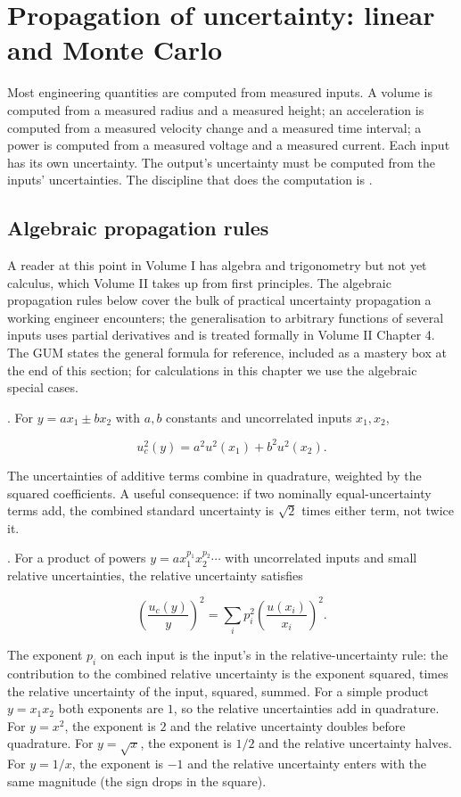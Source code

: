 \section{Propagation of uncertainty: linear and Monte Carlo}

Most engineering quantities are computed from measured inputs. A
volume is computed from a measured radius and a measured height; an
acceleration is computed from a measured velocity change and a
measured time interval; a power is computed from a measured voltage
and a measured current. Each input has its own uncertainty. The
output's uncertainty must be computed from the inputs'
uncertainties. The discipline that does the computation is
.

\subsection{Algebraic propagation rules}

A reader at this point in Volume I has algebra and trigonometry but
not yet calculus, which Volume II takes up from first principles.
The algebraic propagation rules below cover the bulk of practical
uncertainty propagation a working engineer encounters; the
generalisation to arbitrary functions of several inputs uses partial
derivatives and is treated formally in Volume II Chapter 4. The
GUM \cite{std:iso-iec-guide98} states the general formula for
reference, included as a mastery box at the end of this section; for
calculations in this chapter we use the algebraic special cases.

. For $y = a x_{1} \pm b x_{2}$ with
$a, b$ constants and uncorrelated inputs $x_{1}, x_{2}$,

\[
u_{c}^{2}(y) = a^{2} u^{2}(x_{1}) + b^{2} u^{2}(x_{2}).
\]

The uncertainties of additive terms combine in quadrature, weighted
by the squared coefficients. A useful consequence: if two nominally
equal-uncertainty terms add, the combined standard uncertainty is
$\sqrt{2}$ times either term, not twice it.

. For a product of powers
$y = a x_{1}^{p_{1}} x_{2}^{p_{2}} \cdots$ with uncorrelated inputs
and small relative uncertainties, the relative uncertainty satisfies

\[
\left(\frac{u_{c}(y)}{y}\right)^{2} = \sum_{i} p_{i}^{2}
\left(\frac{u(x_{i})}{x_{i}}\right)^{2}.
\]

The exponent $p_{i}$ on each input is the input's
 in the relative-uncertainty rule:
the contribution to the combined relative uncertainty is the
exponent squared, times the relative uncertainty of the input,
squared, summed. For a simple product $y = x_{1} x_{2}$ both
exponents are $1$, so the relative uncertainties add in quadrature.
For $y = x^{2}$, the exponent is $2$ and the relative uncertainty
doubles before quadrature. For $y = \sqrt{x}$, the exponent is
$1/2$ and the relative uncertainty halves. For $y = 1/x$, the
exponent is $-1$ and the relative uncertainty enters with the same
magnitude (the sign drops in the square).


